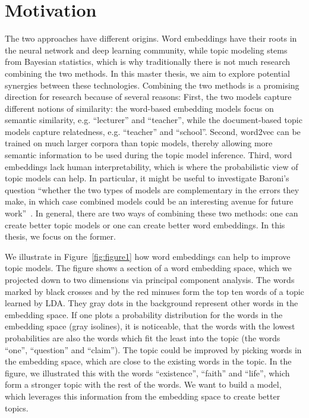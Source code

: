 \documentclass[
        a4paper,
        titlepage,
        twoside,
        parskip,
        numbers=noenddot
        ]{scrbook}
\theoremstyle{break}
\begin{document}
\section{Motivation}
The two approaches have different origins.
Word embeddings have their roots in the neural network and deep learning community, while topic modeling stems from Bayesian statistics, which is why traditionally there is not much research combining the two methods.
In this master thesis, we aim to explore potential synergies between these technologies.
Combining the two methods is a promising direction for research because of several reasons:
First, the two models capture different notions of similarity: the word-based embedding models focus on semantic similarity, e.g. ``lecturer'' and ``teacher'', while the document-based topic models capture relatedness, e.g. ``teacher'' and ``school''.
Second, word2vec can be trained on much larger corpora than topic models, thereby allowing more semantic information to be used during the topic model inference.
Third, word embeddings lack human interpretability, which is where the probabilistic view of topic models can help.
In particular, it might be useful to investigate Baroni's question ``whether the two types of models are complementary in the errors they make, in which case combined models could be an interesting avenue for future work''~\cite{Baroni2014}.
In general, there are two ways of combining these two methods: one can create better topic models or one can create better word embeddings.
In this thesis, we focus on the former.

We illustrate in Figure~\ref{fig:figure1} how word embeddings can help to improve topic models.
The figure shows a section of a word embedding space, which we projected down to two dimensions via principal component analysis.
The words marked by black crosses and by the red minuses form the top ten words of a topic learned by LDA.
They gray dots in the background represent other words in the embedding space.
If one plots a probability distribution for the words in the embedding space (gray isolines), it is noticeable, that the words with the lowest probabilities are also the words which fit the least into the topic (the words ``one'', ``question'' and ``claim'').
The topic could be improved by picking words in the embedding space, which are close to the existing words in the topic.
In the figure, we illustrated this with the words ``existence'', ``faith'' and ``life'', which form a stronger topic with the rest of the words.
We want to build a model, which leverages this information from the embedding space to create better topics.
\end{document}
